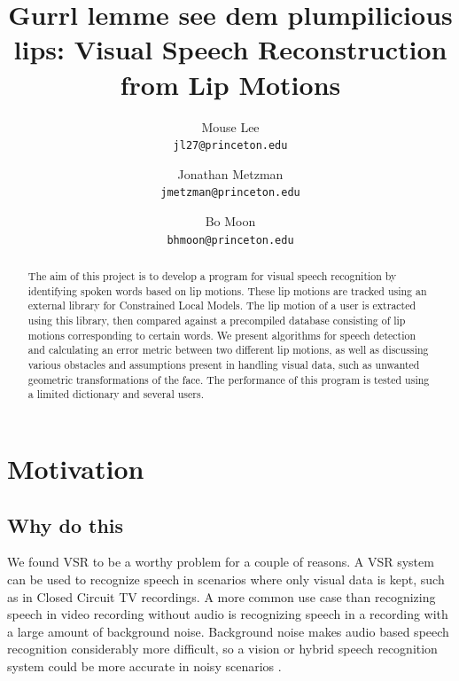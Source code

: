 \documentclass[10pt,twocolumn,letterpaper]{article}
\begin{document}
\title{Gurrl lemme see dem plumpilicious lips: Visual Speech Reconstruction from Lip Motions}

\author{Mouse Lee\\
{\tt\small jl27@princeton.edu}
\and
Jonathan Metzman\\
{\tt\small jmetzman@princeton.edu}
\and
Bo Moon\\
{\tt\small bhmoon@princeton.edu}
}

\maketitle

\begin{abstract}
  The aim of this project is to develop a program for visual speech recognition by identifying spoken words based on lip motions. These lip motions are tracked using an external library for Constrained Local Models. The lip motion of a user is extracted using this library, then compared against a precompiled database consisting of lip motions corresponding to certain words. We present algorithms for speech detection and calculating an error metric between two different lip motions, as well as discussing various obstacles and assumptions present in handling visual data, such as unwanted geometric transformations of the face. The performance of this program is tested using a limited dictionary and several users.
\end{abstract}

\section{Motivation}
\subsection{Why do this}
We found VSR to be a worthy problem for a couple of reasons. A VSR system can be used to recognize speech in scenarios where only visual data is kept, such as in Closed Circuit TV recordings. A more common use case than recognizing speech in video recording without audio is recognizing speech in a recording with a large amount of background noise. Background noise makes audio based speech recognition considerably more difficult, so a vision or hybrid speech recognition system could be more accurate in noisy scenarios \cite{Dupont}.
\end{document}
